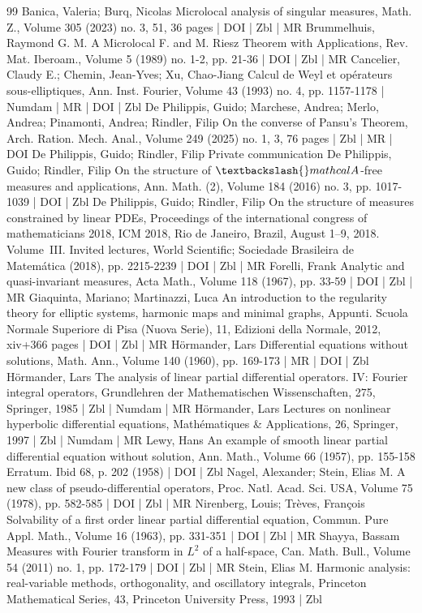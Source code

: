 \begin{thebibliography}{99}
 Banica, Valeria; Burq, Nicolas Microlocal analysis of singular measures, Math. Z., Volume 305 (2023) no. 3, 51, 36 pages | DOI | Zbl | MR
 Brummelhuis, Raymond G. M. A Microlocal F. and M. Riesz Theorem with Applications, Rev. Mat. Iberoam., Volume 5 (1989) no. 1-2, pp. 21-36 | DOI | Zbl | MR
 Cancelier, Claudy E.; Chemin, Jean-Yves; Xu, Chao-Jiang Calcul de Weyl et opérateurs sous-elliptiques, Ann. Inst. Fourier, Volume 43 (1993) no. 4, pp. 1157-1178 | Numdam | MR | DOI | Zbl
 De Philippis, Guido; Marchese, Andrea; Merlo, Andrea; Pinamonti, Andrea; Rindler, Filip On the converse of Pansu’s Theorem, Arch. Ration. Mech. Anal., Volume 249 (2025) no. 1, 3, 76 pages | Zbl | MR | DOI
 De Philippis, Guido; Rindler, Filip Private communication
 De Philippis, Guido; Rindler, Filip On the structure of $\textbackslash{}mathcal{A}$-free measures and applications, Ann. Math. (2), Volume 184 (2016) no. 3, pp. 1017-1039 | DOI | Zbl
 De Philippis, Guido; Rindler, Filip On the structure of measures constrained by linear PDEs, Proceedings of the international congress of mathematicians 2018, ICM 2018, Rio de Janeiro, Brazil, August 1–9, 2018. Volume III. Invited lectures, World Scientific; Sociedade Brasileira de Matemática (2018), pp. 2215-2239 | DOI | Zbl | MR
 Forelli, Frank Analytic and quasi-invariant measures, Acta Math., Volume 118 (1967), pp. 33-59 | DOI | Zbl | MR
 Giaquinta, Mariano; Martinazzi, Luca An introduction to the regularity theory for elliptic systems, harmonic maps and minimal graphs, Appunti. Scuola Normale Superiore di Pisa (Nuova Serie), 11, Edizioni della Normale, 2012, xiv+366 pages | DOI | Zbl | MR
 Hörmander, Lars Differential equations without solutions, Math. Ann., Volume 140 (1960), pp. 169-173 | MR | DOI | Zbl
 Hörmander, Lars The analysis of linear partial differential operators. IV: Fourier integral operators, Grundlehren der Mathematischen Wissenschaften, 275, Springer, 1985 | Zbl | Numdam | MR
 Hörmander, Lars Lectures on nonlinear hyperbolic differential equations, Mathématiques \& Applications, 26, Springer, 1997 | Zbl | Numdam | MR
 Lewy, Hans An example of smooth linear partial differential equation without solution, Ann. Math., Volume 66 (1957), pp. 155-158 Erratum. Ibid 68, p. 202 (1958) | DOI | Zbl
 Nagel, Alexander; Stein, Elias M. A new class of pseudo-differential operators, Proc. Natl. Acad. Sci. USA, Volume 75 (1978), pp. 582-585 | DOI | Zbl | MR
 Nirenberg, Louis; Trèves, François Solvability of a first order linear partial differential equation, Commun. Pure Appl. Math., Volume 16 (1963), pp. 331-351 | DOI | Zbl | MR
 Shayya, Bassam Measures with Fourier transform in ${L}^2$ of a half-space, Can. Math. Bull., Volume 54 (2011) no. 1, pp. 172-179 | DOI | Zbl | MR
 Stein, Elias M. Harmonic analysis: real-variable methods, orthogonality, and oscillatory integrals, Princeton Mathematical Series, 43, Princeton University Press, 1993 | Zbl
\end{thebibliography}
